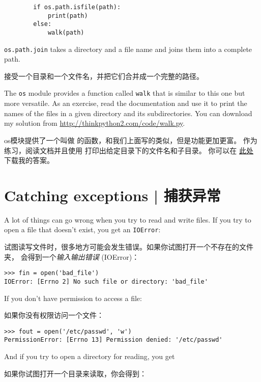 {{{{{{{\begin{lstlisting}
        if os.path.isfile(path):
            print(path)
        else:
            walk(path)
\end{lstlisting}

%
{\tt os.path.join} takes a directory and a file name and joins
them into a complete path.

 接受一个目录和一个文件名，并把它们合并成一个完整的路径。

The {\tt os} module provides a function called {\tt walk} that is
similar to this one but more versatile.  As an exercise, read the
documentation and use it to print the names of the files in a given
directory and its subdirectories.  You can download my solution from
\url{http://thinkpython2.com/code/walk.py}.

os模块提供了一个叫做  的函数，和我们上面写的类似，但是功能更加更富。
作为练习，阅读文档并且使用  打印出给定目录下的文件名和子目录。
你可以在 \href{http://thinkpython2.com/code/walk.py}{此处} 下载我的答案。


\section{Catching exceptions  |  捕获异常}
\label{catch}

A lot of things can go wrong when you try to read and write
files.  If you try to open a file that doesn't exist, you get an
{\tt IOError}:

试图读写文件时，很多地方可能会发生错误。如果你试图打开一个不存在的文件夹，
会得到一个{\em 输入输出错误} (IOError)：

  
  

\begin{lstlisting}
>>> fin = open('bad_file')
IOError: [Errno 2] No such file or directory: 'bad_file'
\end{lstlisting}
%
If you don't have permission to access a file:

如果你没有权限访问一个文件：

  

\begin{lstlisting}
>>> fout = open('/etc/passwd', 'w')
PermissionError: [Errno 13] Permission denied: '/etc/passwd'
\end{lstlisting}

%
And if you try to open a directory for reading, you get

如果你试图打开一个目录来读取，你会得到：

}}}}}}}
